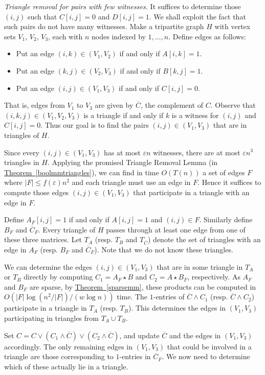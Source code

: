 \documentclass[10pt]{article}
\theoremstyle{definition}
\numberwithin{equation}{section}
\newcommand{\expref}[2]{\texorpdfstring{\hyperref[#2]{#1~\ref{#2}}}{#1~\ref{#2}}}
\newcommand{\eps}{\varepsilon}
\begin{document}
\noindent
\emph{Triangle removal for pairs with few witnesses.} It suffices to determine those $(i,j)$ such that $C[i,j] = 0$ and $D[i,j] = 1$. We shall exploit the fact that such pairs do not have many witnesses. Make a tripartite graph $H$ with vertex sets $V_1$, $V_2$, $V_3$, each with $n$ nodes indexed by $1,\ldots,n$. Define edges as follows:
\begin{itemize}
\item Put an edge $(i,k) \in (V_1,V_2)$ if and only if $A[i,k]=1$.
\item Put an edge  $(k,j) \in (V_2,V_3)$  if and only if $B[k,j]=1$.
\item Put an edge $(i,j) \in (V_1,V_3)$ if and only if $C[i,j]=0$.\end{itemize}
That is, edges from $V_1$ to $V_3$ are given by $\overline{C}$, the complement of $C$. Observe that
$(i,k,j) \in (V_1,V_2,V_3)$ is a triangle if and only if $k$ is a witness for $(i,j)$ and $C[i,j] = 0$. Thus our goal is to find the pairs $(i,j)\in (V_1,V_3)$ that are in triangles of $H$.

Since every $(i,j) \in (V_1,V_3)$ has at most $\eps n$ witnesses, there are at most $\eps n^3$ triangles in $H$. Applying the promised Triangle Removal Lemma (in \expref{Theorem}{boolmmtriangles}), we can find in time $O(T(n))$ a set of edges $F$ where $|F| \leq f(\eps) n^2$ and each triangle must use an edge in $F$. Hence it suffices to compute those edges $(i,j) \in (V_1,V_3)$ that participate in a triangle with an edge in $F$. 

Define $A_F[i,j]=1$ if and only if $A[i,j]=1$ and $(i,j) \in F$. Similarly define $B_F$ and $\overline{C}_F$. Every triangle of $H$ passes through at least one edge from one of these three matrices. Let $T_A$ (resp. $T_B$ and $T_{\overline{C}}$) denote the set of triangles with an edge in ${A}_F$ (resp. $B_F$ and ${\overline{C}}_F$).  Note that we do not know these triangles.

We can determine the edges $(i,j) \in (V_1,V_3)$ that are in some triangle in $T_A$ or $T_B$ directly by computing $C_1 = {A}_F \star B$ and $C_2 = A \star {B}_F$, respectively. As $A_F$ and $B_F$ are sparse, by \expref{Theorem}{sparsemm}, these products can be computed in $O(|F|\log(n^2/|F|)/(w\log n))$ time. The $1$-entries of $\overline{C} \wedge C_1$ (resp. $\overline{C} \wedge C_2$) participate in a triangle in $T_A$ (resp. $T_B$). This determines the edges in $(V_1,V_3)$ participating in triangles from $T_A \cup T_B$.

Set $C = C \vee (C_1 \wedge \overline{C}) \vee (C_2 \wedge \overline{C})$, and update $\overline{C}$ and the edges in $(V_1,V_3)$ accordingly. The only remaining edges in $(V_1,V_3)$ that could be involved in a triangle are those corresponding to $1$-entries in ${\overline{C}}_F$. We now need to determine which of these actually lie in a triangle. 
\end{document}
